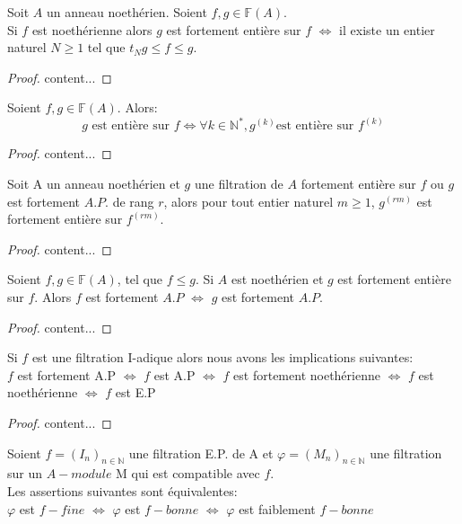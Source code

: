 \begin{maproposition}
	Soit $A$ un anneau noethérien. Soient $f,g \in \mathbb{F}(A)$.\\ Si $f$ est noethérienne alors $g$ est fortement entière sur $f$ $\Longleftrightarrow$ il existe un entier naturel $N \geqslant 1$ tel que $t_{N}g \leqslant f \leqslant g$.
\end{maproposition}
\begin{proof}
	content...
\end{proof}
\begin{maproposition}
	Soient $f,g \in \mathbb{F}(A)$. Alors:
	\[ g \text{ est entière sur } f \Longleftrightarrow \forall k \in \mathbb{N}^{*}, g^{(k)} \text{est entière sur } f^{(k)} \]
\end{maproposition}
\begin{proof}
	content...
\end{proof}
\begin{maproposition}
	Soit A un anneau noethérien et $g$ une filtration de $A$ fortement entière sur $f$ ou $g$ est fortement $A.P.$ de rang $r$, alors pour tout entier naturel $m \geqslant 1$, $g^{(rm)}$ est fortement entière sur $f^{(rm)}$.  
\end{maproposition}
\begin{proof}
	content...
\end{proof}
\begin{moncorollaire}
	Soient $f,g \in \mathbb{F}(A)$, tel que $f \leqslant g$. Si $A$ est noethérien et $g$ est fortement entière sur $f$. Alors $f$ est fortement $A.P$ $\Longleftrightarrow$ $g$ est fortement $A.P.$
\end{moncorollaire}
\begin{proof}
	content...
\end{proof}
\begin{maproposition}
	Si $f$ est une filtration I-adique alors nous avons les implications suivantes:\\
	$f$ est fortement A.P $\Longleftrightarrow $ $f$ est A.P $\Longleftrightarrow $ $f$ est fortement noethérienne $\Longleftrightarrow $ $f$ est noethérienne $\Longleftrightarrow $ $f$ est E.P
\end{maproposition}
\begin{proof}
	content...
\end{proof}
\begin{maproposition}
	Soient $f=(I_n)_{n \in \mathbb{N}}$ une filtration E.P. de A et $\varphi=(M_n)_{n \in \mathbb{N}}$ une filtration sur un $A-module$ M qui est compatible avec $f$.\\
	Les assertions suivantes sont équivalentes:\\
	$\varphi$ est $f-fine$ $\Longleftrightarrow $ $\varphi$ est $f-bonne$ $\Longleftrightarrow $ $\varphi$ est faiblement $f-bonne$
\end{maproposition}
